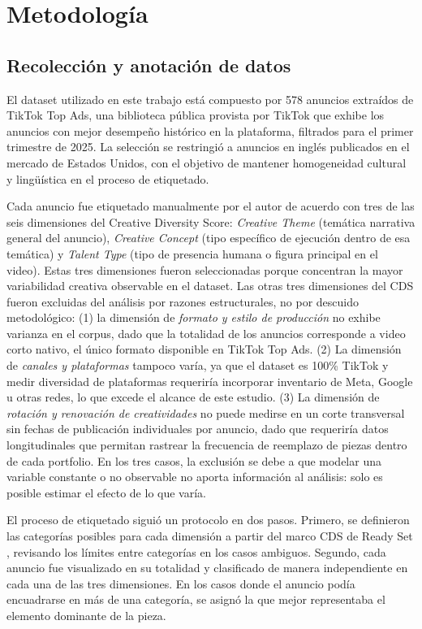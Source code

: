 \documentclass[12pt, a4paper]{report}
\begin{document}
\chapter{Metodología}

\section{Recolección y anotación de datos}

El dataset utilizado en este trabajo está compuesto por 578 anuncios extraídos de TikTok Top Ads,
una biblioteca pública provista por TikTok que exhibe los anuncios con mejor desempeño histórico
en la plataforma, filtrados para el primer trimestre de 2025. La selección se restringió a anuncios
en inglés publicados en el mercado de Estados Unidos, con el objetivo de mantener homogeneidad
cultural y lingüística en el proceso de etiquetado.

Cada anuncio fue etiquetado manualmente por el autor de acuerdo con tres de las seis dimensiones
del Creative Diversity Score: \textit{Creative Theme} (temática narrativa general del anuncio),
\textit{Creative Concept} (tipo específico de ejecución dentro de esa temática) y \textit{Talent
Type} (tipo de presencia humana o figura principal en el video). Estas tres dimensiones fueron seleccionadas porque concentran la mayor variabilidad
creativa observable en el dataset. Las otras tres dimensiones del CDS fueron excluidas
del análisis por razones estructurales, no por descuido metodológico: (1) la dimensión
de \textit{formato y estilo de producción} no exhibe varianza en el corpus, dado que la
totalidad de los anuncios corresponde a video corto nativo, el único formato disponible
en TikTok Top Ads. (2) La dimensión de \textit{canales y plataformas} tampoco varía,
ya que el dataset es 100\% TikTok y medir diversidad de plataformas requeriría
incorporar inventario de Meta, Google u otras redes, lo que excede el alcance de este
estudio. (3) La dimensión de \textit{rotación y renovación de creatividades} no puede
medirse en un corte transversal sin fechas de publicación individuales por anuncio,
dado que requeriría datos longitudinales que permitan rastrear la frecuencia de
reemplazo de piezas dentro de cada portfolio. En los tres casos, la exclusión se debe
a que modelar una variable constante o no observable no aporta información al análisis:
solo es posible estimar el efecto de lo que varía.

El proceso de etiquetado siguió un protocolo en dos pasos. Primero, se definieron las categorías
posibles para cada dimensión a partir del marco CDS de Ready Set \citep{readyset2025}, revisando
los límites entre categorías en los casos ambiguos. Segundo, cada anuncio fue visualizado en
su totalidad y clasificado de manera independiente en cada una de las tres dimensiones. En los
casos donde el anuncio podía encuadrarse en más de una categoría, se asignó la que mejor
representaba el elemento dominante de la pieza.
\end{document}
